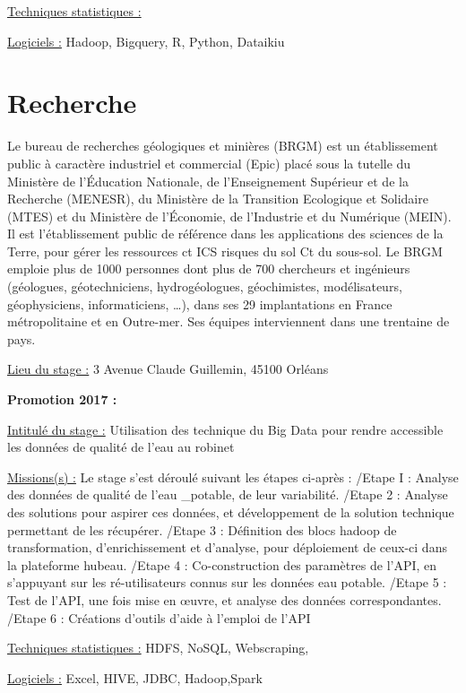 \documentclass[
  letterpaper,
  DIV=11,
  numbers=noendperiod]{scrreprt}
\begin{document}
\uline{Techniques statistiques :}

\uline{Logiciels :} Hadoop, Bigquery, R, Python, Dataikiu


\hypertarget{recherche}{%
\chapter{Recherche}\label{recherche}}

Le bureau de recherches géologiques et minières (BRGM) est un
établissement public à caractère industriel et commercial (Epic) placé
sous la tutelle du Ministère de l'Éducation Nationale, de l'Enseignement
Supérieur et de la Recherche (MENESR), du Ministère de la Transition
Ecologique et Solidaire (MTES) et du Ministère de l'Économie, de
l'Industrie et du Numérique (MEIN). Il est l'établissement public de
référence dans les applications des sciences de la Terre, pour gérer les
ressources ct ICS risques du sol Ct du sous-sol. Le BRGM emploie plus de
1000 personnes dont plus de 700 chercheurs et ingénieurs (géologues,
géotechniciens, hydrogéologues, géochimistes, modélisateurs,
géophysiciens, informaticiens, \ldots), dans ses 29 implantations en
France métropolitaine et en Outre-mer. Ses équipes interviennent dans
une trentaine de pays.

\uline{Lieu du stage :} 3 Avenue Claude Guillemin, 45100 Orléans

\textbf{Promotion 2017 :}

\uline{Intitulé du stage :} Utilisation des technique du Big Data pour
rendre accessible les données de qualité de l'eau au robinet

\uline{Missions(s) :} Le stage s'est déroulé suivant les étapes ci-après
: /Etape I : Analyse des données de qualité de l'eau \_potable, de leur
variabilité. /Etape 2 : Analyse des solutions pour aspirer ces données,
et développement de la solution technique permettant de les récupérer.
/Etape 3 : Définition des blocs hadoop de transformation,
d'enrichissement et d'analyse, pour déploiement de ceux-ci dans la
plateforme hubeau. /Etape 4 : Co-construction des paramètres de l'API,
en s'appuyant sur les ré-utilisateurs connus sur les données eau
potable. /Etape 5 : Test de l'API, une fois mise en œuvre, et analyse
des données correspondantes. /Etape 6 : Créations d'outils d'aide à
l'emploi de l'API

\uline{Techniques statistiques :} HDFS, NoSQL, Webscraping,

\uline{Logiciels :} Excel, HIVE, JDBC, Hadoop,Spark
\end{document}
